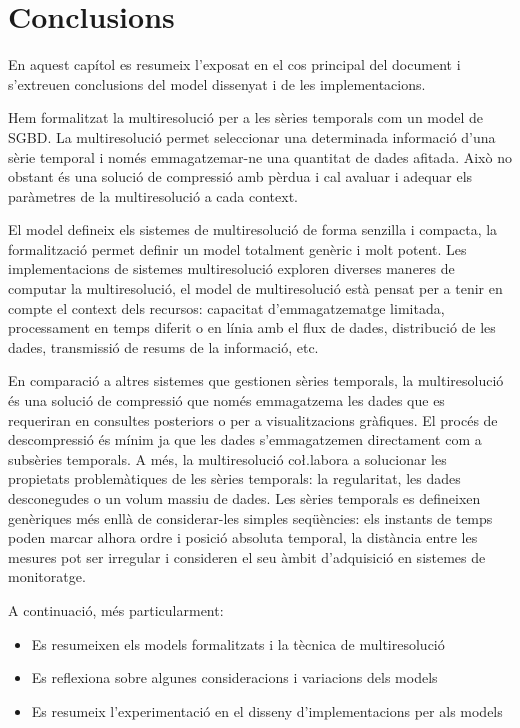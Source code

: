 \chapter{Conclusions}
\label{sec:conclusions}


En aquest capítol es resumeix l'exposat en el cos principal del
document i s'extreuen conclusions del model dissenyat i de les
implementacions.


Hem formalitzat la multiresolució per a les sèries temporals com un
model de \gls{SGBD}. La multiresolució permet seleccionar una
determinada informació d'una sèrie temporal i només emmagatzemar-ne
una quantitat de dades afitada. Això no obstant és una solució de
compressió amb pèrdua i cal avaluar i adequar els paràmetres de la
multiresolució a cada context.


El model defineix els sistemes de multiresolució de forma senzilla i
compacta, la formalització permet definir un model totalment genèric i
molt potent. Les implementacions de sistemes multiresolució exploren
diverses maneres de computar la multiresolució, el model de
multiresolució està pensat per a tenir en compte el context dels
recursos: capacitat d'emmagatzematge limitada, processament en temps
diferit o en línia amb el flux de dades, distribució de les dades,
transmissió de resums de la informació, etc.



En comparació a altres sistemes que gestionen sèries temporals, la
multiresolució és una solució de compressió que només emmagatzema les
dades que es requeriran en consultes posteriors o per a
visualitzacions gràfiques. El procés de descompressió és mínim ja que
les dades s'emmagatzemen directament com a subsèries temporals. A més,
la multiresolució co\l.labora a solucionar les propietats
problemàtiques de les sèries temporals: la regularitat, les dades
desconegudes o un volum massiu de dades.  Les sèries temporals es
defineixen genèriques més enllà de considerar-les simples seqüències:
els instants de temps poden marcar alhora ordre i posició absoluta
temporal, la distància entre les mesures pot ser irregular i
consideren el seu àmbit d'adquisició en sistemes de monitoratge.



A continuació, més particularment:

\begin{itemize}
\item Es resumeixen els models formalitzats i la tècnica de
  multiresolució

\item Es reflexiona sobre algunes consideracions i variacions dels models

\item Es resumeix l'experimentació en el disseny d'implementacions per
  als models

\end{itemize}








